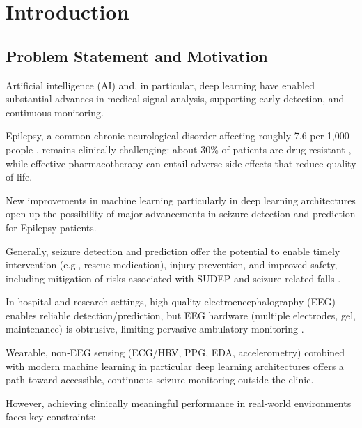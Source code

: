 \section{Introduction}

\subsection{Problem Statement and Motivation}

Artificial intelligence (AI) and, in particular, deep learning have enabled substantial advances in
medical signal analysis, supporting early detection, and continuous monitoring.

Epilepsy, a common chronic neurological disorder affecting roughly 7.6 per 1,000 people
\parencite{beghiEpidemiologyEpilepsy2019}, remains clinically challenging: about 30\% of
patients are drug resistant \parencite{kwanEarlyIdentificationRefractory2000,chenNewEraPersonalised2020},
while effective pharmacotherapy can entail adverse side effects that reduce quality of life.

New improvements in machine learning particularly in deep learning architectures open
up the possibility of major advancements in seizure detection and prediction for Epilepsy patients.

Generally, seizure detection and prediction offer the potential to enable timely
intervention (e.g., rescue medication), injury prevention, and improved safety, including
mitigation of risks associated with SUDEP and seizure‑related falls \parencite{hesdorfferCombinedAnalysisRisk2011}.

In hospital and research settings, high‑quality electroencephalography (EEG) enables
reliable detection/prediction, but EEG hardware (multiple electrodes, gel, maintenance)
is obtrusive, limiting pervasive ambulatory monitoring \parencite{chenNewEraPersonalised2020}.

Wearable, non‑EEG sensing (ECG/HRV, PPG, EDA, accelerometry) combined with modern
machine learning in particular deep learning architectures offers a path toward accessible, 
continuous seizure monitoring outside the clinic.

However, achieving clinically meaningful performance in real‑world environments faces key
constraints:

